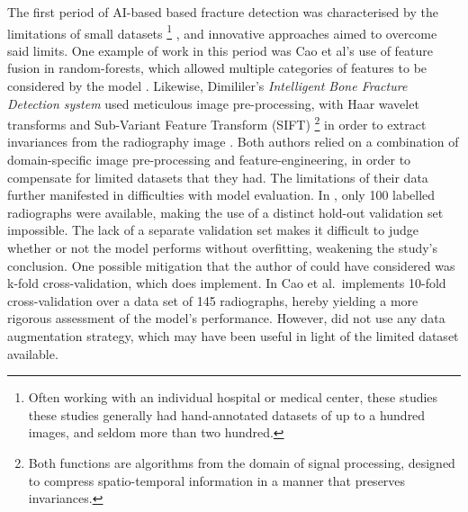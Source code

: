 The first period of AI-based based fracture detection was characterised by the limitations of small datasets
\footnote{Often working with an individual hospital or medical center, these studies these studies generally had hand-annotated datasets of up to a hundred images, and seldom more than two hundred.}
, and innovative approaches aimed to overcome said limits. One example of work in this period was Cao et al's use of feature fusion in random-forests, which allowed multiple categories of features to be considered by the model \autocite{Cao2015}.
Likewise, Dimililer's \emph{Intelligent Bone Fracture Detection system} used meticulous image pre-processing, with Haar wavelet transforms and Sub-Variant Feature Transform (SIFT)
\footnote{Both functions are algorithms from the domain of signal processing, designed to compress spatio-temporal information in a manner that preserves invariances.}
in order to extract invariances from the radiography image \autocite{Dimililer2017}.
Both authors relied on a combination of domain-specific image pre-processing and feature-engineering, in order to compensate for limited datasets that they had.
The limitations of their data further manifested in difficulties with model evaluation. In \autocite{Dimililer2017}, only 100 labelled radiographs were available, making the use of a distinct hold-out validation set impossible. The lack of a separate validation set makes it difficult to judge whether or not the model performs without overfitting, weakening the study's conclusion. One possible mitigation that the author of \autocite{Dimililer2017} could have considered was k-fold cross-validation, which \autocite{Cao2015} does implement.
In \autocite{Cao2015} Cao et al.~implements 10-fold cross-validation over a data set of 145 radiographs, hereby yielding a more rigorous assessment of the model's performance. However, \autocite{Cao2015} did not use any data augmentation strategy, which may have been useful in light of the limited dataset available.


